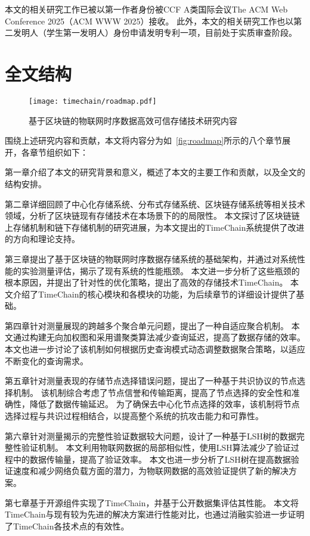 本文的相关研究工作已被以第一作者身份被CCF A类国际会议The ACM Web Conference 2025（ACM WWW 2025）接收。
此外，本文的相关研究工作也以第二发明人（学生第一发明人）身份申请发明专利一项，目前处于实质审查阶段。

\section{全文结构}

\begin{figure}[t]
    \centering
    \texttt{[image: timechain/roadmap.pdf]}
    \caption{基于区块链的物联网时序数据高效可信存储技术研究内容}
    \label{fig:roadmap}
\end{figure}

围绕上述研究内容和贡献，本文将内容分为如~\autoref{fig:roadmap}所示的八个章节展开，各章节组织如下：

第一章介绍了本文的研究背景和意义，概述了本文的主要工作和贡献，以及全文的结构安排。

第二章详细回顾了中心化存储系统、分布式存储系统、区块链存储系统等相关技术领域，分析了区块链现有存储技术在本场景下的的局限性。
本文探讨了区块链链上存储机制和链下存储机制的研究进展，为本文提出的TimeChain系统提供了改进的方向和理论支持。

第三章提出了基于区块链的物联网时序数据存储系统的基础架构，并通过对系统性能的实验测量评估，揭示了现有系统的性能瓶颈。
本文进一步分析了这些瓶颈的根本原因，并提出了针对性的优化策略，提出了高效的存储技术TimeChain。
本文介绍了TimeChain的核心模块和各模块的功能，为后续章节的详细设计提供了基础。

第四章针对测量展现的跨越多个聚合单元问题，提出了一种自适应聚合机制。
本文通过构建无向加权图和采用谱聚类算法减少查询延迟，提高了数据存储的效率。
本文也进一步讨论了该机制如何根据历史查询模式动态调整数据聚合策略，以适应不断变化的查询需求。

第五章针对测量表现的存储节点选择错误问题，提出了一种基于共识协议的节点选择机制。
该机制综合考虑了节点信誉和传输距离，提高了节点选择的安全性和准确性，降低了数据传输延迟。
为了确保去中心化节点选择的效率，该机制将节点选择过程与共识过程相结合，以提高整个系统的抗攻击能力和可靠性。

第六章针对测量揭示的完整性验证数据较大问题，设计了一种基于LSH树的数据完整性验证机制。
本文利用物联网数据的局部相似性，使用LSH算法减少了验证过程中的数据传输量，提高了验证效率。
本文也进一步分析了LSH树在提高数据验证速度和减少网络负载方面的潜力，为物联网数据的高效验证提供了新的解决方案。

第七章基于开源组件实现了TimeChain，并基于公开数据集评估其性能。
本文将TimeChain与现有较为先进的解决方案进行性能对比，也通过消融实验进一步证明了TimeChain各技术点的有效性。

